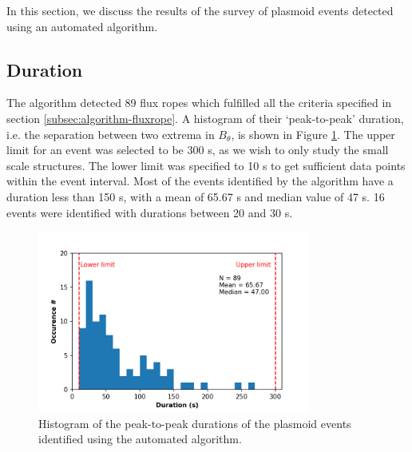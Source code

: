 In this section, we discuss the results of the survey of plasmoid events detected using an automated algorithm. 

\subsection{Duration}

The algorithm detected 89 flux ropes which fulfilled all the criteria specified in section \ref{subsec:algorithm-fluxrope}. A histogram of their `peak-to-peak' duration, i.e. the separation between two extrema in $B_\theta$, is shown in Figure \ref{fig:duration-histogram}. The upper limit for an event was selected to be 300 s, as we wish to only study the small scale structures. The lower limit was specified to 10 s to get sufficient data points within the event interval. Most of the events identified by the algorithm have a duration less than 150 s, with a mean of 65.67 s and median value of 47 s. 16 events were identified with durations between 20 and 30 s. 

\begin{figure}
    \centering
    \includegraphics[width=0.8\textwidth]{images6/duration_histogram.png}
    \caption{Histogram of the peak-to-peak durations of the plasmoid events identified using the automated algorithm. }
    \label{fig:duration-histogram}
\end{figure}

